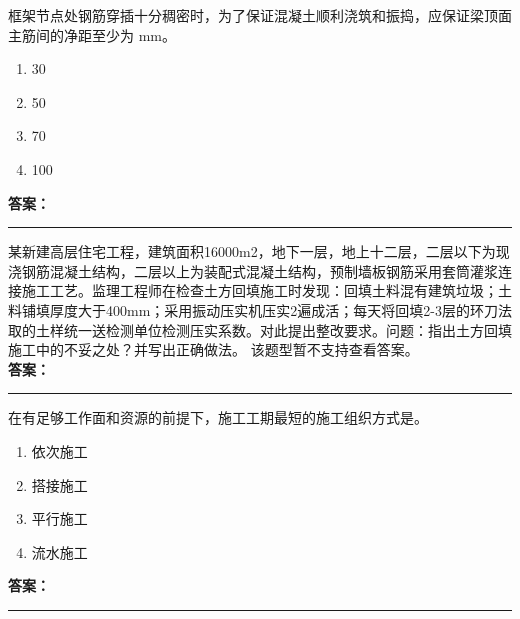 \documentclass[UTF8,fontset=fandol,11pt]{ctexart}
\newcommand{\answerline}{\textcolor{answerred}{\rule{2.4cm}{0.7pt}}}
\begin{document}
\begin{quizbox}[title={乱序第 216 题｜第四章混凝土结构工程}]

框架节点处钢筋穿插十分稠密时，为了保证混凝土顺利浇筑和振捣，应保证梁顶面主筋间的净距至少为 mm。\\

\begin{enumerate}[label=\Alph*.]

\item 30

\item 50

\item 70

\item 100

\end{enumerate}

\textbf{\textcolor{answerred}{答案：}} \answerline

\end{quizbox}

\vspace{0.2em}

\begin{quizbox}[title={乱序第 217 题｜第一章土方工程}]

某新建高层住宅工程，建筑面积16000m2，地下一层，地上十二层，二层以下为现浇钢筋混凝土结构，二层以上为装配式混凝土结构，预制墙板钢筋采用套筒灌浆连接施工工艺。监理工程师在检查土方回填施工时发现：回填土料混有建筑垃圾；土料铺填厚度大于400mm；采用振动压实机压实2遍成活；每天将回填2-3层的环刀法取的土样统一送检测单位检测压实系数。对此提出整改要求。问题：指出土方回填施工中的不妥之处？并写出正确做法。 该题型暂不支持查看答案。\\

\textbf{\textcolor{answerred}{答案：}} \answerline

\end{quizbox}

\vspace{0.2em}

\begin{quizbox}[title={乱序第 218 题｜第十章流水施工原理}]

在有足够工作面和资源的前提下，施工工期最短的施工组织方式是。\\

\begin{enumerate}[label=\Alph*.]

\item 依次施工

\item 搭接施工

\item 平行施工

\item 流水施工

\end{enumerate}

\textbf{\textcolor{answerred}{答案：}} \answerline

\end{quizbox}
\end{document}
